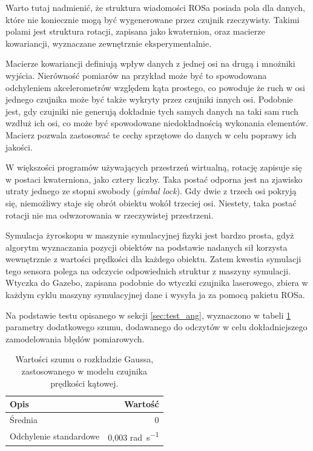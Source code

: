 	Warto tutaj nadmienić, że struktura wiadomości ROSa posiada pola dla danych, które nie koniecznie mogą być wygenerowane przez czujnik rzeczywisty.
	Takimi polami jest struktura rotacji, zapisana jako kwaternion, oraz macierze kowariancji, wyznaczane zewnętrznie eksperymentalnie.
	
	Macierze kowariancji definiują wpływ danych z jednej osi na drugą i mnożniki wyjścia. 
	Nierówność pomiarów na przykład może być to spowodowana odchyleniem akcelerometrów względem kąta prostego, co powoduje że ruch w osi jednego czujnika może
	być także wykryty przez czujniki innych osi. 
	Podobnie jest, gdy czujniki nie generują dokładnie tych samych danych na taki sam ruch wzdłuż ich osi, co może być spowodowane niedokładnością wykonania elementów.
	Macierz pozwala zastosować te cechy sprzętowe do danych w celu poprawy ich jakości.
	
	W większości programów używających przestrzeń wirtualną, rotację zapisuje się w postaci kwaterniona, jako cztery liczby.
	Taka postać odporna jest na zjawisko utraty jednego ze stopni swobody (\emph{gimbal lock}). Gdy dwie z trzech osi pokryją się, niemożliwy staje się obrót obiektu wokół trzeciej osi. Niestety, taka postać rotacji nie ma odwzorowania w rzeczywistej przestrzeni.
	
	Symulacja żyroskopu w maszynie symulacyjnej fizyki jest bardzo prosta, gdyż algorytm wyznaczania pozycji obiektów na podstawie nadanych sił korzysta wewnętrznie z
	wartości prędkości dla każdego obiektu. Zatem kwestia symulacji tego sensora polega na odczycie odpowiednich struktur z maszyny symulacji.
	Wtyczka do Gazebo, zapisana podobnie do wtyczki czujnika laserowego, zbiera w każdym cyklu maszyny symulacyjnej dane i wysyła ja za pomocą pakietu ROSa.
	
	Na podstawie testu opisanego w sekcji \ref{sec:test_ang}, wyznaczono w tabeli \ref{tab:imu_noise} parametry dodatkowego szumu, dodawanego do odczytów w celu dokładniejszego zamodelowania błędów pomiarowych.
	
	\begin{table}
		\centering
		\begin{tabular}{l r}
		Opis & Wartość \\
		\hline
		Średnia					&	0 \\
		Odchylenie standardowe	&	0,003 \si{\radian\per\second} \\
		\end{tabular}
		\caption{Wartości szumu o rozkładzie Gaussa, zastosowanego w modelu czujnika prędkości kątowej.}
		\label{tab:imu_noise}
	\end{table}
	
